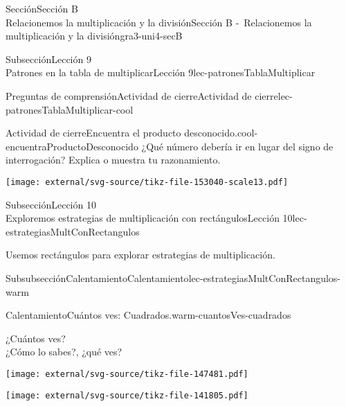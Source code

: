 \begin{sectionptx}{Sección}{{\Large Sección B\\}Relacionemos la multiplicación y la división}{}{Sección B -~Relacionemos la multiplicación y la división}{}{}{gra3-uni4-secB}
\begin{subsectionptx}{Subsección}{{\normalsize Lección 9\\[-0.05cm]}Patrones en la tabla de multiplicar}{}{Lección 9}{}{}{lec-patronesTablaMultiplicar}
\begin{reading-questions-subsubsection}{Preguntas de comprensión}{Actividad de cierre}{}{Actividad de cierre}{}{}{lec-patronesTablaMultiplicar-cool}
\begin{project}{Actividad de cierre}{Encuentra el producto desconocido.}{cool-encuentraProductoDesconocido}%
¿Qué número debería ir en lugar del signo de interrogación? Explica o muestra tu razonamiento.%
\begin{image}{0}{1}{0}{}%
\texttt{[image: external/svg-source/tikz-file-153040-scale13.pdf]}
\end{image}%
\end{project}%
\end{reading-questions-subsubsection}
\end{subsectionptx}
%
%
\typeout{************************************************}
\typeout{************************************************}
%
\begin{subsectionptx}{Subsección}{{\normalsize Lección 10\\[-0.05cm]}Exploremos estrategias de multiplicación con rectángulos}{}{Lección 10}{}{}{lec-estrategiasMultConRectangulos}
\begin{introduction}{}%
Usemos rectángulos para explorar estrategias de multiplicación.%
\end{introduction}%
%
%
\typeout{************************************************}
\typeout{************************************************}
%
\begin{subsubsectionptx}{Subsubsección}{Calentamiento}{}{Calentamiento}{}{}{lec-estrategiasMultConRectangulos-warm}
\begin{exploration}{Calentamiento}{Cuántos ves: Cuadrados.}{warm-cuantosVes-cuadrados}%
\begin{minipage}[t]{0.4\textwidth}
\vspace{0pt}
¿Cuántos ves?\\
 ¿Cómo lo sabes?, ¿qué ves?%
\end{minipage}\hfill
\begin{minipage}[t]{0.6\textwidth}
\vspace{0pt}
\begin{sidebyside}{3}{0}{0}{0.05}%
\begin{sbspanel}{0.3}%
\texttt{[image: external/svg-source/tikz-file-147481.pdf]}
\end{sbspanel}%
\begin{sbspanel}{0.3}%
\texttt{[image: external/svg-source/tikz-file-141805.pdf]}

\end{sbspanel}
\end{sidebyside}
\end{minipage}
\end{exploration}
\end{subsubsectionptx}
\end{subsectionptx}
\end{sectionptx}
